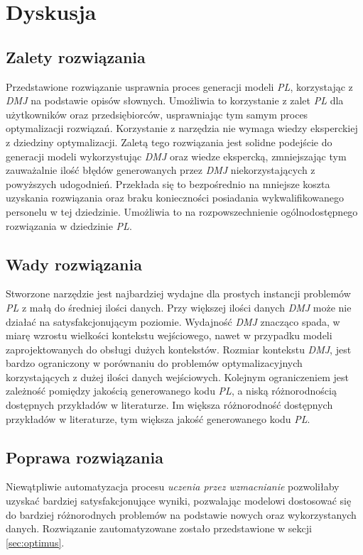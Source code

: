 
\chapter{Dyskusja}\label{ch:discussion}

\section{Zalety rozwiązania}

Przedstawione rozwiązanie usprawnia proces generacji modeli \textit{PL}, korzystając z \textit{DMJ} na podstawie opisów słownych. Umożliwia to korzystanie z zalet \textit{PL} dla użytkowników oraz przedsiębiorców, usprawniając tym samym proces optymalizacji rozwiązań. Korzystanie z narzędzia nie wymaga wiedzy eksperckiej z dziedziny optymalizacji. Zaletą tego rozwiązania jest solidne podejście do generacji modeli wykorzystując \textit{DMJ} oraz wiedze ekspercką, zmniejszając tym zauważalnie ilość błędów generowanych przez \textit{DMJ} niekorzystających z powyższych udogodnień. Przekłada się to bezpośrednio na mniejsze koszta uzyskania rozwiązania oraz braku konieczności posiadania wykwalifikowanego personelu w tej dziedzinie. Umożliwia to na rozpowszechnienie ogólnodostępnego rozwiązania w dziedzinie \textit{PL}. 

\section{Wady rozwiązania}
Stworzone narzędzie jest najbardziej wydajne dla prostych instancji problemów \textit{PL} z małą do średniej ilości danych. Przy większej ilości danych \textit{DMJ} może nie działać na satysfakcjonującym poziomie. Wydajność \textit{DMJ} znacząco spada, w miarę wzrostu wielkości kontekstu wejściowego, nawet w przypadku modeli zaprojektowanych do obsługi dużych kontekstów. Rozmiar kontekstu \textit{DMJ}, jest bardzo ograniczony w porównaniu do problemów optymalizacyjnych korzystających z dużej ilości danych wejściowych. \cite{10.1162/tacl_a_00638} Kolejnym ograniczeniem jest zależność pomiędzy jakością generowanego kodu \textit{PL}, a niską różnorodnością dostępnych przykładów w literaturze. Im większa różnorodność dostępnych przykładów w literaturze, tym większa jakość generowanego kodu \textit{PL}.

\section{Poprawa rozwiązania}
Niewątpliwie automatyzacja procesu \textit{uczenia przez wzmacnianie} pozwoliłaby uzyskać bardziej satysfakcjonujące wyniki, pozwalając modelowi dostosować się do bardziej różnorodnych problemów na podstawie nowych oraz wykorzystanych danych. Rozwiązanie zautomatyzowane zostało przedstawione w sekcji \ref{sec:optimus}. 

